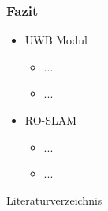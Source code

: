 \documentclass{beamer}
\begin{document}
%
% 
%
\begin{frame}
	\frametitle{Fazit}
	\begin{itemize}
		\item UWB Modul
			\begin{itemize}
				\item ...
				\item ...
			\end{itemize}
		\item RO-SLAM
			\begin{itemize}
				\item ...
				\item ...
			\end{itemize}
	\end{itemize}
\end{frame}


%
% 
%
\begin{frame}[allowframebreaks]{Literaturverzeichnis}
	\printbibliography[
		heading=bibintoc,
		title={Literaturverzeichnis},
	]
\end{frame}


%
% 
%
\end{document}
